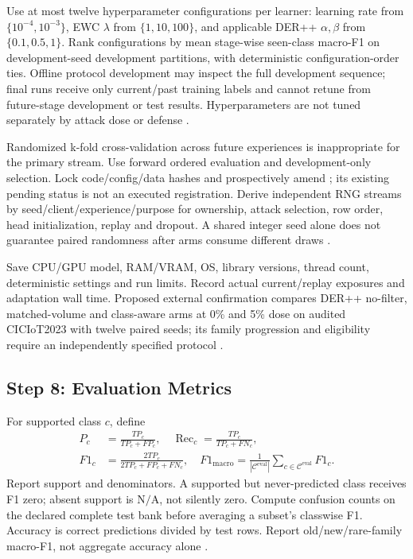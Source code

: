 \documentclass[10pt,a4paper]{article}
\newcommand{\NA}{\mathrm{N/A}}
\begin{document}
Use at most twelve hyperparameter configurations per learner: learning rate from $\{10^{-4},10^{-3}\}$, EWC $\lambda$ from $\{1,10,100\}$, and applicable DER++ $\alpha,\beta$ from $\{0.1,0.5,1\}$. Rank configurations by mean stage-wise seen-class macro-F1 on development-seed development partitions, with deterministic configuration-order ties. Offline protocol development may inspect the full development sequence; final runs receive only current/past training labels and cannot retune from future-stage development or test results. Hyperparameters are not tuned separately by attack dose or defense \cite{repo}.

Randomized k-fold cross-validation across future experiences is inappropriate for the primary stream. Use forward ordered evaluation and development-only selection. Lock code/config/data hashes and prospectively amend ; its existing pending status is not an executed registration. Derive independent RNG streams by seed/client/experience/purpose for ownership, attack selection, row order, head initialization, replay and dropout. A shared integer seed alone does not guarantee paired randomness after arms consume different draws \cite{repo}.

Save CPU/GPU model, RAM/VRAM, OS, library versions, thread count, deterministic settings and run limits. Record actual current/replay exposures and adaptation wall time. Proposed external confirmation compares DER++ no-filter, matched-volume and class-aware arms at 0\% and 5\% dose on audited CICIoT2023 with twelve paired seeds; its family progression and eligibility require an independently specified protocol \cite{ciciot,repo}.

\subsection{Step 8: Evaluation Metrics}
For supported class $c$, define
\begin{equation}
\begin{aligned}
P_c&=\frac{TP_c}{TP_c+FP_c},\quad \operatorname{Rec}_c=\frac{TP_c}{TP_c+FN_c},\\
F1_c&=\frac{2TP_c}{2TP_c+FP_c+FN_c},\quad
F1_{\mathrm{macro}}=\frac{1}{|\mathcal C^{\mathrm{eval}}|}\sum_{c\in\mathcal C^{\mathrm{eval}}}F1_c.
\end{aligned}
\end{equation}
Report support and denominators. A supported but never-predicted class receives F1 zero; absent support is $\NA$, not silently zero. Compute confusion counts on the declared complete test bank before averaging a subset's classwise F1. Accuracy is correct predictions divided by test rows. Report old/new/rare-family macro-F1, not aggregate accuracy alone \cite{carillo,guo,repo}.
\end{document}
